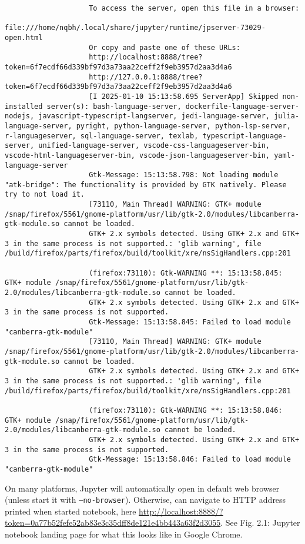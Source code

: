 \documentclass{article}
\begin{document}
\begin{enumerate}
\begin{itemize}
\begin{itemize}
\begin{itemize}
\begin{verbatim}
					To access the server, open this file in a browser:
					file:///home/nqbh/.local/share/jupyter/runtime/jpserver-73029-open.html
					Or copy and paste one of these URLs:
					http://localhost:8888/tree?token=6f7ecdf66d339bf97d3a73aa22ceff2f9eb3957d2aa3d4a6
					http://127.0.0.1:8888/tree?token=6f7ecdf66d339bf97d3a73aa22ceff2f9eb3957d2aa3d4a6
					[I 2025-01-10 15:13:58.695 ServerApp] Skipped non-installed server(s): bash-language-server, dockerfile-language-server-nodejs, javascript-typescript-langserver, jedi-language-server, julia-language-server, pyright, python-language-server, python-lsp-server, r-languageserver, sql-language-server, texlab, typescript-language-server, unified-language-server, vscode-css-languageserver-bin, vscode-html-languageserver-bin, vscode-json-languageserver-bin, yaml-language-server
					Gtk-Message: 15:13:58.798: Not loading module "atk-bridge": The functionality is provided by GTK natively. Please try to not load it.
					[73110, Main Thread] WARNING: GTK+ module /snap/firefox/5561/gnome-platform/usr/lib/gtk-2.0/modules/libcanberra-gtk-module.so cannot be loaded.
					GTK+ 2.x symbols detected. Using GTK+ 2.x and GTK+ 3 in the same process is not supported.: 'glib warning', file /build/firefox/parts/firefox/build/toolkit/xre/nsSigHandlers.cpp:201
					
					(firefox:73110): Gtk-WARNING **: 15:13:58.845: GTK+ module /snap/firefox/5561/gnome-platform/usr/lib/gtk-2.0/modules/libcanberra-gtk-module.so cannot be loaded.
					GTK+ 2.x symbols detected. Using GTK+ 2.x and GTK+ 3 in the same process is not supported.
					Gtk-Message: 15:13:58.845: Failed to load module "canberra-gtk-module"
					[73110, Main Thread] WARNING: GTK+ module /snap/firefox/5561/gnome-platform/usr/lib/gtk-2.0/modules/libcanberra-gtk-module.so cannot be loaded.
					GTK+ 2.x symbols detected. Using GTK+ 2.x and GTK+ 3 in the same process is not supported.: 'glib warning', file /build/firefox/parts/firefox/build/toolkit/xre/nsSigHandlers.cpp:201
					
					(firefox:73110): Gtk-WARNING **: 15:13:58.846: GTK+ module /snap/firefox/5561/gnome-platform/usr/lib/gtk-2.0/modules/libcanberra-gtk-module.so cannot be loaded.
					GTK+ 2.x symbols detected. Using GTK+ 2.x and GTK+ 3 in the same process is not supported.
					Gtk-Message: 15:13:58.846: Failed to load module "canberra-gtk-module"
				\end{verbatim}
				On many platforms, Jupyter will automatically open in default web browser (unless start it with {\tt--no-browser}). Otherwise, can navigate to HTTP address printed when started notebook, here \url{http://localhost:8888/?token=0a77b52fefe52ab83e3c35dff8de121e4bb443a63f2d3055}. See {\sf Fig. 2.1: Jupyter notebook landing page} for what this looks like in Google Chrome.
				

\end{itemize}
\end{itemize}
\end{itemize}
\end{enumerate}
\end{document}
